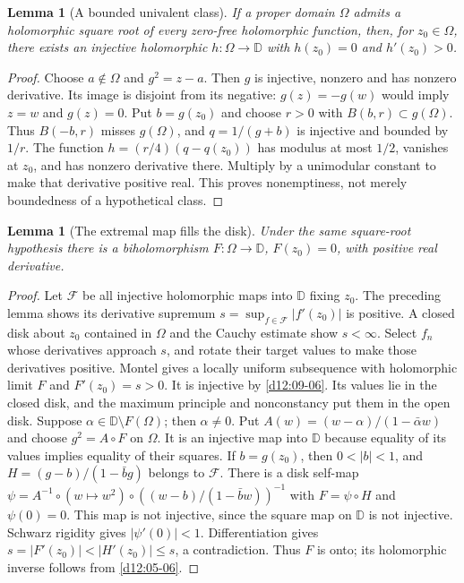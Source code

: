 \documentclass[11pt,a4paper,openany]{book}
\newtheorem{lemma}[theorem]{Lemma}
\theoremstyle{definition}
\theoremstyle{remark}\newtheorem{remark}[theorem]{Remark}
\newcommand{\D}{\mathbb D}\newcommand{\Chat}{\widehat{\mathbb C}}
\newcommand{\family}[1]{}
\begin{document}
\begin{lemma}[A bounded univalent class]\family{D12.12.02}\label{d12:12-02}
If a proper domain $\Omega$ admits a holomorphic square root of every zero-free holomorphic function, then, for $z_0\in\Omega$, there exists an injective holomorphic $h:\Omega\to\D$ with $h(z_0)=0$ and $h'(z_0)>0$.
\end{lemma}
\begin{proof}
Choose $a\notin\Omega$ and $g^2=z-a$. Then $g$ is injective, nonzero and has nonzero derivative. Its image is disjoint from its negative: $g(z)=-g(w)$ would imply $z=w$ and $g(z)=0$. Put $b=g(z_0)$ and choose $r>0$ with $B(b,r)\subset g(\Omega)$. Thus $B(-b,r)$ misses $g(\Omega)$, and $q=1/(g+b)$ is injective and bounded by $1/r$. The function $h=(r/4)(q-q(z_0))$ has modulus at most $1/2$, vanishes at $z_0$, and has nonzero derivative there. Multiply by a unimodular constant to make that derivative positive real. This proves nonemptiness, not merely boundedness of a hypothetical class.
\end{proof}

\begin{lemma}[The extremal map fills the disk]\family{D12.12.03}\label{d12:12-03}
Under the same square-root hypothesis there is a biholomorphism $F:\Omega\to\D$, $F(z_0)=0$, with positive real derivative.
\end{lemma}
\begin{proof}
Let $\mathcal F$ be all injective holomorphic maps into $\D$ fixing $z_0$. The preceding lemma shows its derivative supremum $s=\sup_{f\in\mathcal F}|f'(z_0)|$ is positive. A closed disk about $z_0$ contained in $\Omega$ and the Cauchy estimate show $s<\infty$. Select $f_n$ whose derivatives approach $s$, and rotate their target values to make those derivatives positive. Montel gives a locally uniform subsequence with holomorphic limit $F$ and $F'(z_0)=s>0$. It is injective by \cref{d12:09-06}. Its values lie in the closed disk, and the maximum principle and nonconstancy put them in the open disk.
Suppose $\alpha\in\D\setminus F(\Omega)$; then $\alpha\ne0$. Put $A(w)=(w-\alpha)/(1-\bar\alpha w)$ and choose $g^2=A\circ F$ on $\Omega$. It is an injective map into $\D$ because equality of its values implies equality of their squares. If $b=g(z_0)$, then $0<|b|<1$, and $H=(g-b)/(1-\bar b g)$ belongs to $\mathcal F$. There is a disk self-map
$\psi=A^{-1}\circ(w\mapsto w^2)\circ((w-b)/(1-\bar b w))^{-1}$
with $F=\psi\circ H$ and $\psi(0)=0$. This map is not injective, since the square map on $\D$ is not injective. Schwarz rigidity gives $|\psi'(0)|<1$. Differentiation gives $s=|F'(z_0)|<|H'(z_0)|\le s$, a contradiction. Thus $F$ is onto; its holomorphic inverse follows from \cref{d12:05-06}.
\end{proof}
\end{document}
